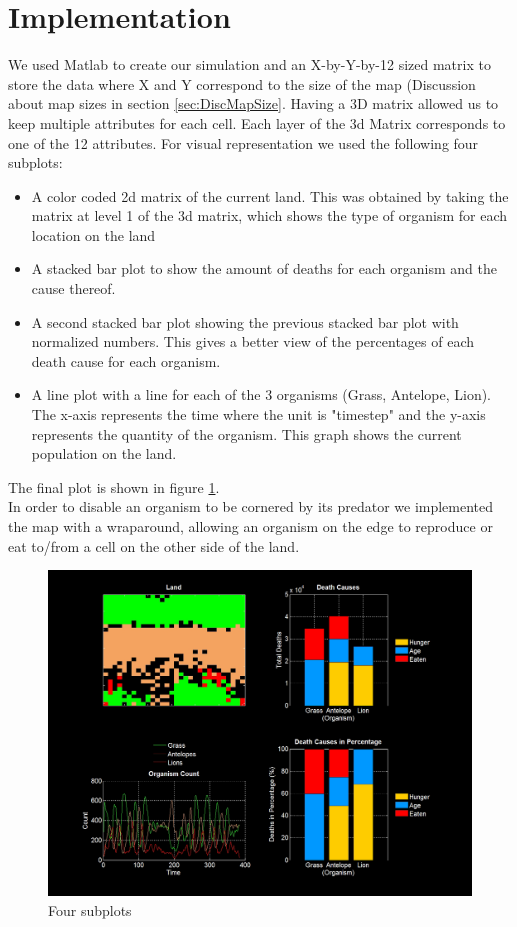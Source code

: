 \documentclass[11pt]{article}
\begin{document}
\section{Implementation}
We used Matlab to create our simulation and an X-by-Y-by-12 sized matrix to store the data where X and Y correspond to the size of the map (Discussion about map sizes in section \ref{sec:DiscMapSize}. Having a 3D matrix allowed us to keep multiple attributes for each cell. Each layer of the 3d Matrix corresponds to one of the 12 attributes. For visual representation we used the following four subplots:
\begin{itemize}
\item A color coded 2d matrix of the current land. This was obtained by taking the matrix at level 1 of the 3d matrix, which shows the type of organism for each location on the land
\item A stacked bar plot to show the amount of deaths for each organism and the cause thereof.
\item  A second stacked bar plot showing the previous stacked bar plot with normalized numbers. This gives a better view of the percentages of each death cause for each organism. 
\item A line plot with a line for each of the 3 organisms (Grass, Antelope, Lion). The x-axis represents the time where the unit is "timestep" and the y-axis represents the quantity of the organism. This graph shows the current population on the land.
\end{itemize}
The final plot is shown in figure \ref{fig:plotScreenshot}.\\
In order to disable an organism to be cornered by its predator we implemented the map with a wraparound, allowing an organism on the edge to reproduce or eat to/from a cell on the other side of the land. 
\begin{figure}
\includegraphics[scale=0.35]{plotScreenshot.png}
\caption{Four subplots}
\label{fig:plotScreenshot}
\end{figure}
\end{document}
